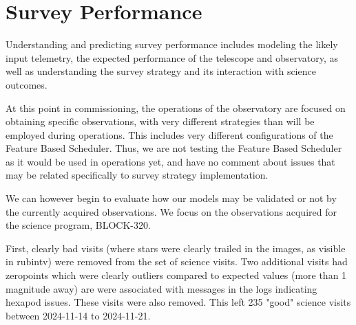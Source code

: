 \section{Survey Performance}
\label{sec:survey_performance}

Understanding and predicting survey performance includes modeling the likely input telemetry, the expected performance of the telescope and observatory, as well as understanding the survey strategy and its interaction with science outcomes. 

At this point in commissioning, the operations of the observatory are focused on obtaining specific observations, with very different strategies than will be employed during operations. This includes very different configurations of the Feature Based Scheduler. Thus, we are not testing the Feature Based Scheduler as it would be used in operations yet, and have no comment about issues that may be related specifically to survey strategy implementation. 

We can however begin to evaluate how our models may be validated or not by the currently acquired observations. We focus on the observations acquired for the science program, BLOCK-320.

First, clearly bad visits (where stars were clearly trailed in the images, as visible in rubintv) were removed from the set of science visits. Two additional visits had zeropoints which were clearly outliers compared to expected values (more than 1 magnitude away) are were associated with messages in the logs indicating hexapod issues. These visits were also removed. This left 235 "good" science visits between 2024-11-14 to 2024-11-21. 

